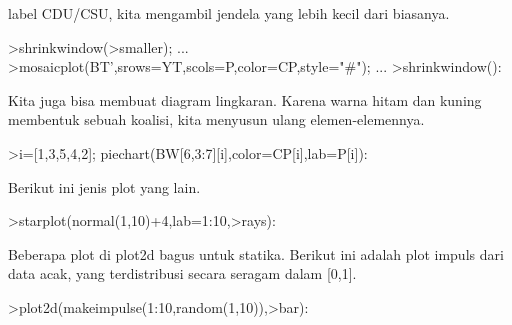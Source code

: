 \documentclass[a4paper,10pt]{article}
\begin{document}
\begin{eulernotebook}
\begin{eulercomment}
\begin{eulercomment}
\begin{eulercomment}
\begin{eulercomment}
\begin{eulercomment}
\begin{eulercomment}
\begin{eulercomment}
\begin{eulercomment}
\begin{eulercomment}
\begin{eulercomment}
\begin{eulercomment}
\begin{eulercomment}
\begin{eulercomment}
\begin{eulercomment}
\begin{eulercomment}
\begin{eulercomment}
\begin{eulercomment}
\begin{eulercomment}
\begin{eulercomment}
\begin{eulercomment}
\begin{eulercomment}
\begin{eulercomment}
\begin{eulercomment}
\begin{eulercomment}
\begin{eulercomment}
\begin{eulercomment}
\begin{eulercomment}
\begin{eulercomment}
\begin{eulercomment}
\begin{eulercomment}
\begin{eulercomment}
\begin{eulercomment}
\begin{eulercomment}
\begin{eulercomment}
\begin{eulercomment}
\begin{eulercomment}
\begin{eulercomment}
\begin{eulercomment}
\begin{eulercomment}
\begin{eulercomment}
\begin{eulercomment}
\begin{eulercomment}
\begin{eulercomment}
\begin{eulercomment}
\begin{eulercomment}
label CDU/CSU, kita mengambil jendela yang lebih kecil dari biasanya.
\end{eulercomment}
\begin{eulerprompt}
>shrinkwindow(>smaller);  ...
>mosaicplot(BT',srows=YT,scols=P,color=CP,style="#"); ...
>shrinkwindow():
\end{eulerprompt}
\begin{eulercomment}
Kita juga bisa membuat diagram lingkaran. Karena warna hitam dan
kuning membentuk sebuah koalisi, kita menyusun ulang elemen-elemennya.
\end{eulercomment}
\begin{eulerprompt}
>i=[1,3,5,4,2]; piechart(BW[6,3:7][i],color=CP[i],lab=P[i]):
\end{eulerprompt}
\begin{eulercomment}
Berikut ini jenis plot yang lain.
\end{eulercomment}
\begin{eulerprompt}
>starplot(normal(1,10)+4,lab=1:10,>rays):
\end{eulerprompt}
\begin{eulercomment}
Beberapa plot di plot2d bagus untuk statika. Berikut ini adalah plot
impuls dari data acak, yang terdistribusi secara seragam dalam [0,1].
\end{eulercomment}
\begin{eulerprompt}
>plot2d(makeimpulse(1:10,random(1,10)),>bar):
\end{eulerprompt}

\end{eulercomment}
\end{eulercomment}
\end{eulercomment}
\end{eulercomment}
\end{eulercomment}
\end{eulercomment}
\end{eulercomment}
\end{eulercomment}
\end{eulercomment}
\end{eulercomment}
\end{eulercomment}
\end{eulercomment}
\end{eulercomment}
\end{eulercomment}
\end{eulercomment}
\end{eulercomment}
\end{eulercomment}
\end{eulercomment}
\end{eulercomment}
\end{eulercomment}
\end{eulercomment}
\end{eulercomment}
\end{eulercomment}
\end{eulercomment}
\end{eulercomment}
\end{eulercomment}
\end{eulercomment}
\end{eulercomment}
\end{eulercomment}
\end{eulercomment}
\end{eulercomment}
\end{eulercomment}
\end{eulercomment}
\end{eulercomment}
\end{eulercomment}
\end{eulercomment}
\end{eulercomment}
\end{eulercomment}
\end{eulercomment}
\end{eulercomment}
\end{eulercomment}
\end{eulercomment}
\end{eulercomment}
\end{eulercomment}
\end{eulernotebook}
\end{document}
